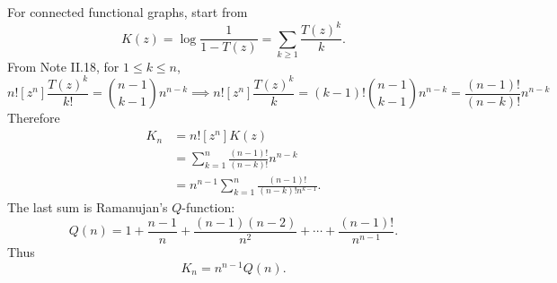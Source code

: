 For connected functional graphs, start from
\begin{equation*}
    K(z) = \log\frac{1}{1 - T(z)}
        = \sum_{k \geq 1} \frac{T(z)^{k}}{k}.
\end{equation*}
From Note II.18, for $1 \leq k \leq n$,
\begin{equation*}
    n![z^{n}] \frac{T(z)^{k}}{k!} = \binom{n - 1}{k - 1} n^{n - k} \implies
        n![z^{n}] \frac{T(z)^{k}}{k} = (k - 1)!\binom{n - 1}{k - 1} n^{n - k} = \frac{(n - 1)!}{(n - k)!} n^{n - k}
\end{equation*}
Therefore
\begin{equation*}
    \begin{aligned}
        K_{n}
        &= n![z^{n}] K(z) \\
        &= \sum_{k = 1}^{n} \frac{(n - 1)!}{(n - k)!} n^{n - k} \\
        &= n^{n - 1} \sum_{k = 1}^{n} \frac{(n - 1)!}{(n - k)!n^{k - 1}}.
    \end{aligned}
\end{equation*}
The last sum is Ramanujan's $Q$-function:
\begin{equation*}
    Q(n)
        = 1 + \frac{n - 1}{n}
            + \frac{(n - 1)(n - 2)}{n^{2}}
            + \cdots
            + \frac{(n - 1)!}{n^{n - 1}}.
\end{equation*}
Thus
\begin{equation*}
    K_n = n^{n - 1}Q(n).
\end{equation*}


